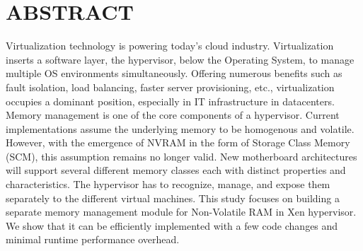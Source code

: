 %
%
%

\chapter*{ABSTRACT}

\pagestyle{plain} %
\setcounter{page}{2}

\indent 

Virtualization technology is powering today's cloud industry. Virtualization inserts a software layer, the hypervisor, below the Operating System, to manage multiple OS environments simultaneously. Offering numerous benefits such as fault isolation, load balancing, faster server provisioning, etc., virtualization occupies a dominant position, especially in IT infrastructure in datacenters. Memory management is one of the core components of a hypervisor. Current implementations assume the underlying memory to be homogenous and volatile. However, with the emergence of NVRAM in the form of Storage Class Memory (SCM), this assumption remains no longer valid. New motherboard architectures will support several different memory classes each with distinct properties and characteristics. The hypervisor has to recognize, manage, and expose them separately to the different virtual machines. This study focuses on building a separate memory management module for Non-Volatile RAM in Xen hypervisor. We show that it can be efficiently implemented with a few code changes and minimal runtime performance overhead.
